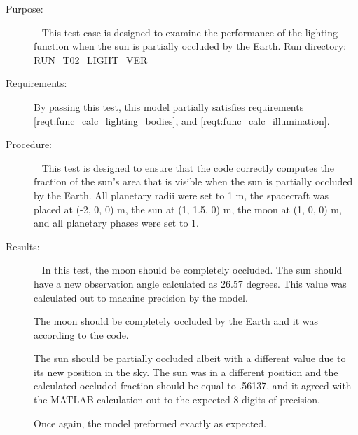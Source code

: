 \label{test:moon_occlud}
\begin{description}
\item[Purpose:] \ \newline
This test case is designed to examine the performance of the lighting
function when the sun is partially occluded by the Earth.
\newline
Run directory: RUN\_T02\_LIGHT\_VER \newline
\item[Requirements:]%
By passing this test, this model partially satisfies requirements
\mbox{\ref{reqt:func_calc_lighting_bodies}}, and
\mbox{\ref{reqt:func_calc_illumination}}.

\item[Procedure:]\ \newline
This test is designed to ensure that the code correctly computes the fraction
of the sun's area that is visible when the sun is partially occluded by the
Earth.  All planetary radii were set to 1 m, the spacecraft was
placed at (-2, 0, 0) m, the sun at (1, 1.5, 0) m, the moon at (1, 0, 0) m, and
all planetary phases were set to 1.
\item[Results:]\ \newline
In this test, the moon should be completely occluded.  The sun should have a
new observation angle calculated as 26.57 degrees.  This value was calculated
out to machine precision by the model.

The moon should be completely occluded by the Earth and it was according to
the code.

The sun should be partially occluded albeit with a different value due to its
new position in the sky.  The sun was in a different position and the
calculated occluded fraction should be equal to .56137, and it agreed with the
MATLAB calculation out to the expected 8 digits of precision.

Once again, the model preformed exactly as expected.

\end{description}

